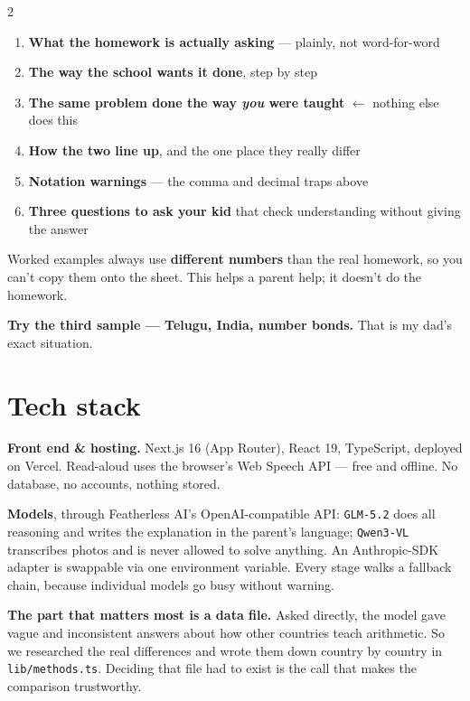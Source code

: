 \documentclass[9pt,letterpaper]{extarticle}
\begin{document}
\begin{multicols}{2}
\begin{enumerate}[leftmargin=13pt,itemsep=1pt,topsep=2pt]
  \item \textbf{What the homework is actually asking} --- plainly, not word-for-word
  \item \textbf{The way the school wants it done}, step by step
  \item \textbf{The same problem done the way \emph{you} were taught} $\leftarrow$ nothing else does this
  \item \textbf{How the two line up}, and the one place they really differ
  \item \textbf{Notation warnings} --- the comma and decimal traps above
  \item \textbf{Three questions to ask your kid} that check understanding without giving the answer
\end{enumerate}

Worked examples always use \textbf{different numbers} than the real homework, so you can't copy them onto the sheet. This helps a parent help; it doesn't do the homework.

\vspace{2pt}
{\color{accent}\textbf{Try the third sample --- Telugu, India, number bonds.} That is my dad's exact situation.}

\section*{Tech stack}

\textbf{Front end \& hosting.} Next.js 16 (App Router), React 19, TypeScript, deployed on Vercel. Read-aloud uses the browser's Web Speech API --- free and offline. No database, no accounts, nothing stored.

\textbf{Models}, through Featherless AI's OpenAI-compatible API: \texttt{GLM-5.2} does all reasoning and writes the explanation in the parent's language; \texttt{Qwen3-VL} transcribes photos and is never allowed to solve anything. An Anthropic-SDK adapter is swappable via one environment variable. Every stage walks a fallback chain, because individual models go busy without warning.

\textbf{The part that matters most is a data file.} Asked directly, the model gave vague and inconsistent answers about how other countries teach arithmetic. So we researched the real differences and wrote them down country by country in \texttt{lib/methods.ts}. Deciding that file had to exist is the call that makes the comparison trustworthy.


\end{multicols}
\end{document}
